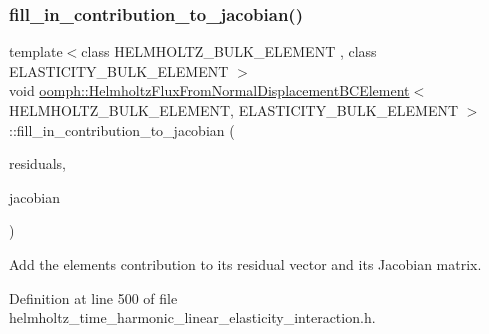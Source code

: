 \subsubsection{\texorpdfstring{fill\+\_\+in\+\_\+contribution\+\_\+to\+\_\+jacobian()}{fill\_in\_contribution\_to\_jacobian()}}
{\footnotesize\ttfamily template$<$class H\+E\+L\+M\+H\+O\+L\+T\+Z\+\_\+\+B\+U\+L\+K\+\_\+\+E\+L\+E\+M\+E\+NT , class E\+L\+A\+S\+T\+I\+C\+I\+T\+Y\+\_\+\+B\+U\+L\+K\+\_\+\+E\+L\+E\+M\+E\+NT $>$ \\
void \hyperlink{classoomph_1_1HelmholtzFluxFromNormalDisplacementBCElement}{oomph\+::\+Helmholtz\+Flux\+From\+Normal\+Displacement\+B\+C\+Element}$<$ H\+E\+L\+M\+H\+O\+L\+T\+Z\+\_\+\+B\+U\+L\+K\+\_\+\+E\+L\+E\+M\+E\+NT, E\+L\+A\+S\+T\+I\+C\+I\+T\+Y\+\_\+\+B\+U\+L\+K\+\_\+\+E\+L\+E\+M\+E\+NT $>$\+::fill\+\_\+in\+\_\+contribution\+\_\+to\+\_\+jacobian (\begin{DoxyParamCaption}\item[{Vector$<$ double $>$ \&}]{residuals,  }\item[{Dense\+Matrix$<$ double $>$ \&}]{jacobian }\end{DoxyParamCaption})\hspace{0.3cm}{\ttfamily [inline]}}



Add the element\textquotesingle{}s contribution to its residual vector and its Jacobian matrix. 



Definition at line 500 of file helmholtz\+\_\+time\+\_\+harmonic\+\_\+linear\+\_\+elasticity\+\_\+interaction.\+h.

\mbox{\label{classoomph_1_1HelmholtzFluxFromNormalDisplacementBCElement_aab5bbb5d7c84d2aa0a5d9112e6f2d914}} 
